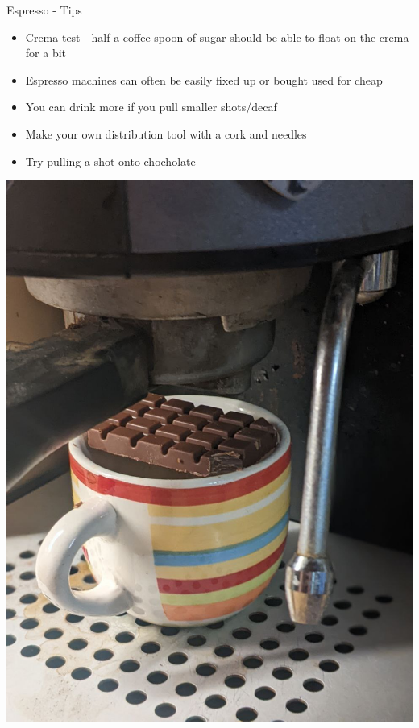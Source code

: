 \documentclass[10pt,graphics,aspectratio=169,table]{beamer}
\begin{document}
\begin{frame}{Espresso - Tips}
    \begin{itemize}
        \item Crema test - half a coffee spoon of sugar should be able to float on the crema for a bit
        \item Espresso machines can often be easily fixed up or bought used for cheap
        \item You can drink more if you pull smaller shots/decaf
        \item Make your own distribution tool with a cork and needles
        \item Try pulling a shot onto chocholate
    \end{itemize}
    \includegraphics[scale =0.08]{img/chocolateShot.jpg} \cite{chocolate}
\end{frame}
\end{document}
